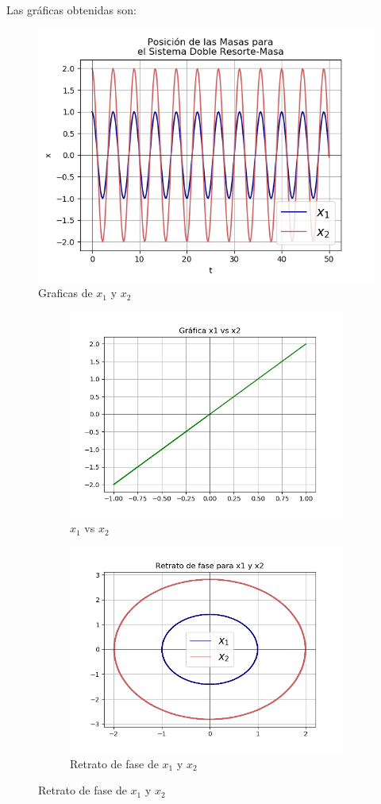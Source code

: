 \documentclass[12pt]{article}
\begin{document}
Las gráficas obtenidas son:
\begin{figure}[h!]
    \centering
\includegraphics[width=5in]{Ej2_11.png}
\caption{Graficas de $x_1$ y $x_2$}
\end{figure}
\begin{figure}[h!]
\begin{subfigure}{.55\textwidth}
  \centering
  \includegraphics[width=.8\linewidth]{Ej2_12.png}
  \caption{$x_1$ vs $x_2$}
  \label{fig:sfig2}
\end{subfigure}
\begin{subfigure}{.55\textwidth}
  \centering
  \includegraphics[width=.8\linewidth]{Ej2_13.png}
  \caption{Retrato de fase de $x_1$ y $x_2$}
  \label{fig:sfig2}
\end{subfigure}
\end{figure}
\end{document}
